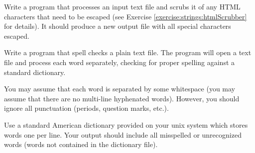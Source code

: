 \begin{exer}
Write a program that processes an input text file and scrubs it
of any HTML characters that need to be escaped (see Exercise
\ref{exercise:strings:htmlScrubber} for details).  It should
produce a new output file with all special characters escaped.
\end{exer}

\begin{exer}
Write a program that spell checks a plain text file.  The program
will open a text file and process each word separately, checking 
for proper spelling against a standard dictionary.  

You may assume that each word is separated by some whitespace 
(you may assume that there are no multi-line hyphenated words).  
However, you should ignore all punctuation (periods, question marks, etc.).

Use a standard American dictionary provided on your unix system
which stores words one per line.  Your output should include all
misspelled or unrecognized words (words not contained in the dictionary 
file).
\end{exer}

